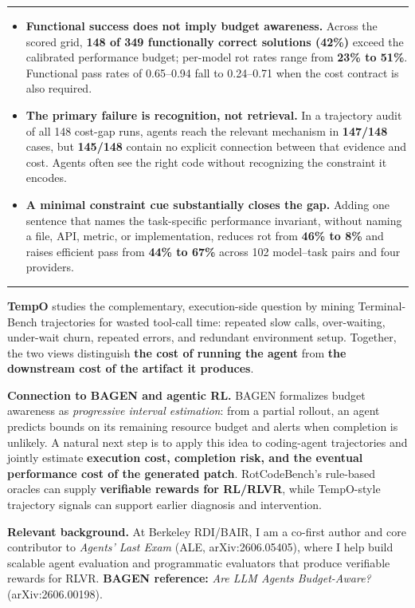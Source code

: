 \documentclass[10pt]{article}
\newcommand{\sectionhead}[1]{%
  \vspace{3pt}{\color{blue}\large\bfseries #1}\par
  {\color{line}\rule{\linewidth}{0.7pt}}\vspace{1pt}
}
\begin{document}
\sectionhead{Core Findings}
\begin{itemize}
  \item \textbf{Functional success does not imply budget awareness.}
  Across the scored grid, \textbf{148 of 349 functionally correct solutions
  (42\%)} exceed the calibrated performance budget; per-model rot rates range
  from \textbf{23\% to 51\%}. Functional pass rates of 0.65--0.94 fall to
  0.24--0.71 when the cost contract is also required.

  \item \textbf{The primary failure is recognition, not retrieval.}
  In a trajectory audit of all 148 cost-gap runs, agents reach the relevant
  mechanism in \textbf{147/148} cases, but \textbf{145/148} contain no explicit
  connection between that evidence and cost. Agents often see the right code
  without recognizing the constraint it encodes.

  \item \textbf{A minimal constraint cue substantially closes the gap.}
  Adding one sentence that names the task-specific performance invariant,
  without naming a file, API, metric, or implementation, reduces rot from
  \textbf{46\% to 8\%} and raises efficient pass from \textbf{44\% to 67\%}
  across 102 model--task pairs and four providers.
\end{itemize}

\sectionhead{From TempO to Budget-Aware Agents}
\textbf{TempO} studies the complementary, execution-side question by mining
Terminal-Bench trajectories for wasted tool-call time: repeated slow calls,
over-waiting, under-wait churn, repeated errors, and redundant environment
setup. Together, the two views distinguish \textbf{the cost of running the
agent} from \textbf{the downstream cost of the artifact it produces}.

\vspace{3pt}
\colorbox{light}{%
  \begin{minipage}{0.982\linewidth}
  \vspace{4pt}
  \textbf{\color{navy}Connection to BAGEN and agentic RL.}
  BAGEN formalizes budget awareness as \emph{progressive interval estimation}:
  from a partial rollout, an agent predicts bounds on its remaining resource
  budget and alerts when completion is unlikely. A natural next step is to
  apply this idea to coding-agent trajectories and jointly estimate
  \textbf{execution cost, completion risk, and the eventual performance cost of
  the generated patch}. RotCodeBench's rule-based oracles can supply
  \textbf{verifiable rewards for RL/RLVR}, while TempO-style trajectory signals
  can support earlier diagnosis and intervention.
  \vspace{4pt}
  \end{minipage}
}

\vspace{5pt}
{\footnotesize\color{muted}
\textbf{Relevant background.} At Berkeley RDI/BAIR, I am a co-first author and
core contributor to \emph{Agents' Last Exam} (ALE, arXiv:2606.05405), where I
help build scalable agent evaluation and programmatic evaluators that produce
verifiable rewards for RLVR. \quad
\textbf{BAGEN reference:} \emph{Are LLM Agents Budget-Aware?}
(arXiv:2606.00198).
}
\end{document}
